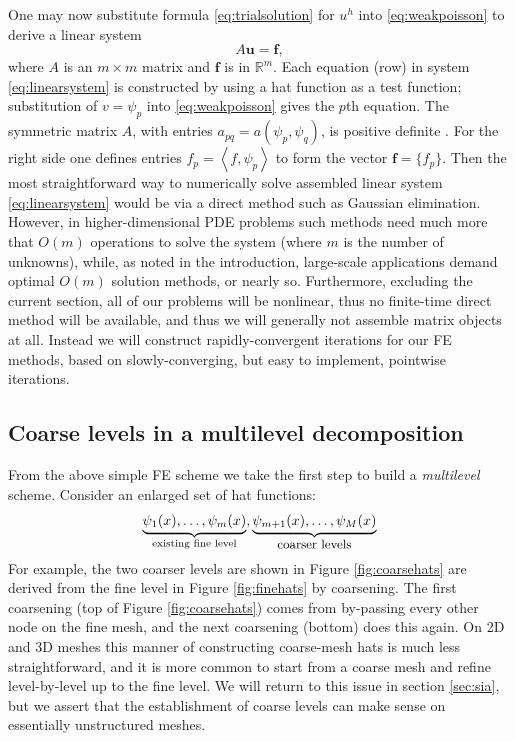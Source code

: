 \documentclass[letterpaper,final,12pt,reqno]{amsart}
\newcommand{\RR}{\mathbb{R}}
\newcommand{\bbf}{\mathbf{f}}
\newcommand{\bu}{\mathbf{u}}
\newcommand{\ip}[2]{\left<#1,#2\right>}
\numberwithin{equation}{section}
\numberwithin{figure}{section}
\numberwithin{table}{section}
\begin{document}
One may now substitute formula \eqref{eq:trialsolution} for $u^h$ into \eqref{eq:weakpoisson} to derive a linear system
\begin{equation}
A \bu = \bbf, \label{eq:linearsystem}
\end{equation}
where $A$ is an $m\times m$ matrix and $\bbf$ is in $\RR^m$.  Each equation (row) in system \eqref{eq:linearsystem} is constructed by using a hat function as a test function; substitution of $v=\psi_p$ into \eqref{eq:weakpoisson} gives the $p$th equation.  The symmetric matrix $A$, with entries $a_{pq} = a(\psi_p,\psi_q)$, is positive definite \cite{Elmanetal2014}.  For the right side one defines entries $f_p = \ip{f}{\psi_p}$ to form the vector $\bbf = \{f_p\}$.  Then the most straightforward way to numerically solve assembled linear system \eqref{eq:linearsystem} would be via a direct method such as Gaussian elimination.  However, in higher-dimensional PDE problems such methods need much more that $O(m)$ operations to solve the system (where $m$ is the number of unknowns), while, as noted in the introduction, large-scale applications demand optimal $O(m)$ solution methods, or nearly so.  Furthermore, excluding the current section, all of our problems will be nonlinear, thus no finite-time direct method will be available, and thus we will generally not assemble matrix objects at all.  Instead we will construct rapidly-convergent iterations for our FE methods, based on slowly-converging, but easy to implement, pointwise iterations.

\subsection*{Coarse levels in a multilevel decomposition}  From the above simple FE scheme we take the first step to build a \emph{multilevel} scheme.  Consider an enlarged set of hat functions:
    $$\underbrace{\psi_1(x),\dots,\psi_m(x)}_{\text{existing fine level}},\underbrace{\psi_{m+1}(x),\dots,\psi_M(x)}_{\text{\small coarser levels}}$$
For example, the two coarser levels are shown in Figure \ref{fig:coarsehats} are derived from the fine level in Figure \ref{fig:finehats} by coarsening.  The first coarsening (top of Figure \ref{fig:coarsehats}) comes from by-passing every other node on the fine mesh, and the next coarsening (bottom) does this again.  On 2D and 3D meshes this manner of constructing coarse-mesh hats is much less straightforward, and it is more common to start from a coarse mesh and refine level-by-level up to the fine level.  We will return to this issue in section \ref{sec:sia}, but we assert that the establishment of coarse levels can make sense on essentially unstructured meshes.
\end{document}
